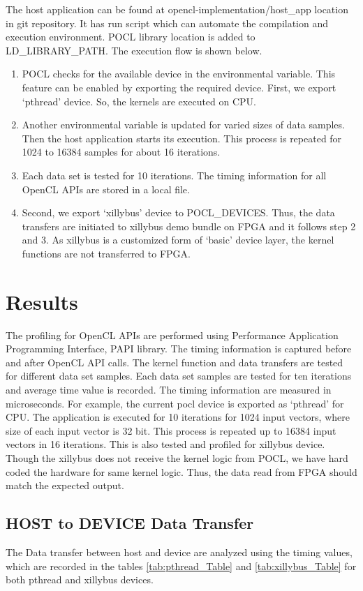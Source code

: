 The host application can be found at opencl-implementation/host\_app location in git repository. It has run script which can automate the compilation and execution environment. POCL library location is added to LD\_LIBRARY\_PATH. The execution flow is shown below.
\begin{enumerate}
	\item POCL checks for the available device in the environmental variable. This feature can be enabled by exporting the required device. First, we export ‘pthread’ device. So, the kernels are executed on CPU.
	\item Another environmental variable is updated for varied sizes of data samples. Then the host application starts its execution. This process is repeated for 1024 to 16384 samples for about 16 iterations. 
	\item Each data set is tested for 10 iterations. The timing information for all OpenCL APIs are stored in a local file.
	\item Second, we export ‘xillybus’ device to POCL\_DEVICES. Thus, the data transfers are initiated to xillybus demo bundle on FPGA and it follows step 2 and 3. As xillybus is a customized form of ‘basic’ device layer, the kernel functions are not transferred to FPGA. 
\end{enumerate}

\section{Results}
The profiling for OpenCL APIs are performed using Performance Application Programming Interface, PAPI library. The timing information is captured before and after OpenCL API calls. The kernel function and data transfers are tested for different data set samples. Each data set samples are tested for ten iterations and average time value is recorded. The timing information are measured in microseconds. For example, the current pocl device is exported as ‘pthread’ for CPU. The application is executed for 10 iterations for 1024 input vectors, where size of each input vector is 32 bit. This process is repeated up to 16384 input vectors in 16 iterations. This is also tested and profiled for xillybus device. Though the xillybus does not receive the kernel logic from POCL, we have hard coded the hardware for same kernel logic. Thus, the data read from FPGA should match the expected output. 

\subsection{HOST to DEVICE Data Transfer}
The Data transfer between host and device are analyzed using the timing values, which are recorded in the tables \ref{tab:pthread_Table} and \ref{tab:xillybus_Table} for both pthread and xillybus devices.



